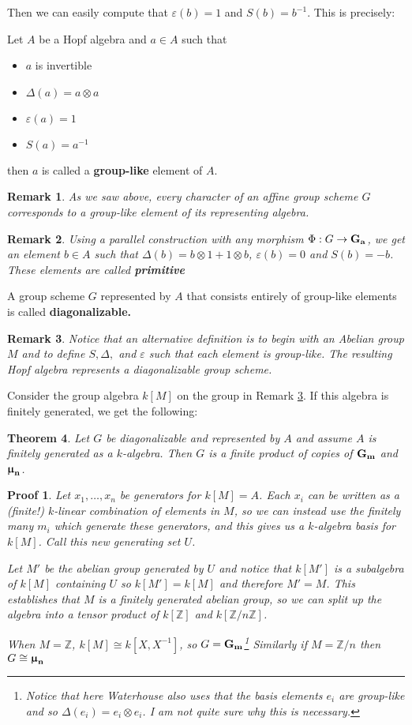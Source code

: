 \documentclass[12pt]{article}
\theoremstyle{nonumberbreak}
\theoremstyle{changebreak}
\newtheorem{thm}{Theorem}[subsection]
\theoremstyle{nonumberplain}
\newtheorem{prf}{Proof}
\theoremstyle{change}
\newtheorem{rmk}[thm]{Remark}
\newcommand*{\bbZ}{\mathbb{Z}}
\newcommand*{\Ga}{\ensuremath\mathbf{G_a}}
\newcommand*{\Gm}{\ensuremath\mathbf{G_m}}
\newcommand*{\mun}[1]{\ensuremath\mathbf{\bm\upmu_#1}}
\begin{document}
Then we can easily compute that $\varepsilon(b)=1$ and $S(b)=b^{-1}$. This is precisely:
\begin{defn}
	Let $A$ be a Hopf algebra and $a\in A$ such that
	\begin{itemize}
		\item $a$ is invertible
		\item $\Delta(a)=a\otimes a$
		\item $\varepsilon(a)=1$
		\item $S(a)=a^{-1}$
	\end{itemize}
	then $a$ is called a \textbf{group-like} element of $A$.
\end{defn}
\begin{rmk}
	As we saw above, every character of an affine group scheme $G$ corresponds to a 
	group-like element of its representing algebra.
\end{rmk}
\begin{rmk}
	Using a parallel construction with any morphism $\Phi:G\to\Ga$, we get an element $b\in A$
	such that $\Delta(b)=b\otimes 1+1\otimes b$, $\varepsilon(b)=0$ and $S(b)=-b$. These elements
	are called \textbf{primitive}
\end{rmk}

\begin{defn}
	A group scheme $G$ represented by $A$ that consists entirely of group-like elements is
	called \textbf{diagonalizable.}
\end{defn}
\begin{rmk}\label{rmk-diag}
	Notice that an alternative definition is to begin with an Abelian group $M$ and to 
	define $S,\Delta,$ and $\varepsilon$ such that each element is group-like. The resulting
	Hopf algebra represents a diagonalizable group scheme.
\end{rmk}

Consider the group algebra $k[M]$ on the group in Remark \ref{rmk-diag}. If this algebra
is finitely generated, we get the following:
\begin{thm}
	Let $G$ be diagonalizable and represented by $A$ and assume $A$ is finitely generated
	as a $k$-algebra. Then $G$ is a finite product of copies of $\Gm$ and $\mun n$.
\end{thm}
\begin{prf}
	Let $x_1,\dots, x_n$ be generators for $k[M]=A$. Each $x_i$ can be written as a (finite!)
	$k$-linear combination of elements in $M$, so we can instead use the finitely many $m_i$
	which generate these generators, and this gives us a $k$-algebra basis for $k[M]$. Call this
	new generating set $U$. 

	Let $M'$ be the abelian group generated by $U$ and notice that $k[M']$ is a subalgebra of
	$k[M]$ containing $U$ so $k[M']=k[M]$ and therefore $M'=M$. This establishes that $M$ is 
	a finitely generated abelian group, so we can split up the algebra into a tensor product
	of $k[\bbZ]$ and $k[\bbZ/n\bbZ]$.

	When $M=\bbZ$, $k[M]\cong k[X,X^{-1}]$, so $G= \Gm$\footnote{Notice that here Waterhouse also
	uses that the basis elements $e_i$ are group-like and so $\Delta(e_i)=e_i\otimes e_i$. I am not
	quite sure why this is necessary.} Similarly if $M=\bbZ/n$ then $G\cong \mun{n}$
\end{prf}
\end{document}
